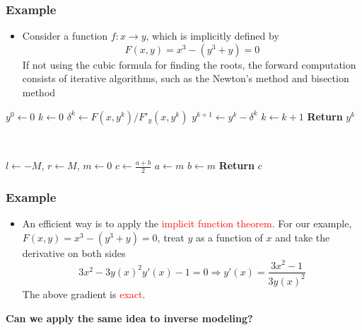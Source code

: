 \documentclass[usenames,dvipsnames]{beamer}
\begin{document}
\begin{frame}
	\frametitle{Example}
	
\begin{itemize}
	\item Consider a function $f:x\rightarrow y$, which is implicitly defined by 
	$$F(x,y) = x^3 - (y^3+y) = 0$$
If not using the cubic formula for finding the roots, the forward computation consists of iterative algorithms, such as the Newton's method and bisection method
\end{itemize}



\begin{minipage}[t]{0.48\textwidth}
\centering
\begin{algorithmic}
\State $y^0 \gets 0$
\State $k \gets 0$
\State $\delta^k \gets F(x, y^k)/F'_y(x,y^k)$
\State $y^{k+1}\gets y^k - \delta^k$
\State $k \gets k+1$
\EndWhile
\State \textbf{Return} $y^k$
\end{algorithmic}
\end{minipage}~
\begin{minipage}[t]{0.48\textwidth}
\centering
\begin{algorithmic}
\State $l \gets -M$, $r\gets M$, $m\gets 0$
\State $c \gets \frac{a+b}{2}$
\State $a\gets m$
\Else
\State $b\gets m$
\EndIf
\EndWhile
\State \textbf{Return} $c$
\end{algorithmic}

\end{minipage}	

\end{frame}


\begin{frame}
	\frametitle{Example}
	
	\begin{itemize}
		\item An efficient way is to apply the \textcolor{red}{implicit function theorem}. For our example, $F(x,y)=x^3-(y^3+y)=0$, treat $y$ as a function of $x$ and take the derivative on both sides
		$$3x^2 - 3y(x)^2y'(x)-1=0\Rightarrow y'(x) = \frac{3x^2-1}{3y(x)^2}$$
	The above gradient is \textcolor{red}{exact}.
	\end{itemize}
	\begin{center}
			\textbf{Can we apply the same idea to inverse modeling?}
	\end{center}

\end{frame}
\end{document}
